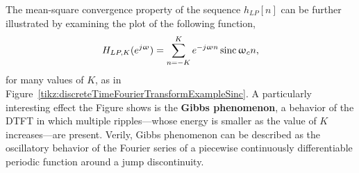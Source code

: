 \documentclass[\documentfontsize, twocolumn]{\classname}
\begin{document}
The mean-square convergence property of the sequence $h_{LP}[n]$ can be further illustrated by examining the plot of the following function,
\[
    H_{LP,K}(e^{j\omega}) = \sum_{n=-K}^K e^{-j\omega n}\sinc {\omega_c n},
\]
for many values of $K$, as in Figure~\ref{tikz:discreteTimeFourierTransformExampleSinc}. A particularly interesting effect the Figure shows is the \textbf{Gibbs phenomenon}, a behavior of the DTFT in which multiple ripples---whose energy is smaller as the value of $K$ increases---are present. Verily, Gibbs phenomenon can be described as the oscillatory behavior of the Fourier series of a piecewise continuously differentiable periodic function around a jump discontinuity.
\begin{figure*}[ht]
\begin{center}
        \begin{tikzpicture}[
            declare function={fourier(\k,\x)=sin(0.4*\x*10 * \k)*(1/(3.1415*\k))*sin(-\x*0.4*10 *\k);}
            ]


\end{tikzpicture}
\end{center}
\end{figure*}
\end{document}
